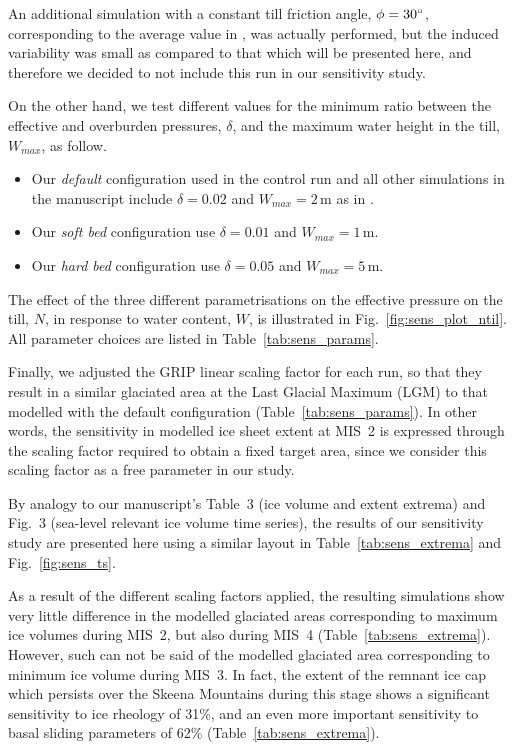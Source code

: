 An additional simulation with a constant till friction angle, $\phi=30^{\circ}$,
corresponding to the average value in \citet[p.~268]{Cuffey.Paterson.2010}, was
actually performed, but the induced variability was small as compared to that
which will be presented here, and therefore we decided to not include this run
in our sensitivity study.

On the other hand, we test different values for the minimum ratio between the
effective and overburden pressures, $\delta$, and the maximum water
height in the till, $W_{max}$, as follow.

\begin{itemize}
    \item{Our \emph{default} configuration used in the control run and all other
          simulations in the manuscript include $\delta=0.02$ and
          $W_{max}=2$\,m as in \citet{Bueler.Pelt.2015}.}
    \item{Our \emph{soft bed} configuration use $\delta=0.01$ and
          $W_{max}=1$\,m.}
    \item{Our \emph{hard bed} configuration use $\delta=0.05$ and
          $W_{max}=5$\,m.}
\end{itemize}

The effect of the three different parametrisations on the effective pressure on
the till, $N$, in response to water content, $W$, is illustrated in
Fig.~\ref{fig:sens_plot_ntil}.
All parameter choices are listed in Table~\ref{tab:sens_params}.

Finally, we adjusted the GRIP linear scaling factor for each run, so that they
result in a similar glaciated area at the Last Glacial Maximum (LGM) to that
modelled with the default configuration (Table~\ref{tab:sens_params}).
In other words, the sensitivity in modelled ice sheet extent at MIS~2 is
expressed through the scaling factor required to obtain a fixed target area,
since we consider this scaling factor as a free parameter in our study.


By analogy to our manuscript's Table~3 (ice volume and extent extrema) and
Fig.~3 (sea-level relevant ice volume time series), the results of our
sensitivity study are presented here using a similar layout in
Table~\ref{tab:sens_extrema} and Fig.~\ref{fig:sens_ts}.

As a result of the different scaling factors applied, the resulting simulations
show very little difference in the modelled glaciated areas corresponding to
maximum ice volumes during MIS~2, but also during MIS~4
(Table~\ref{tab:sens_extrema}). However, such can not be said of the modelled
glaciated area corresponding to minimum ice volume during MIS~3. In fact, the
extent of the remnant ice cap which persists over the Skeena Mountains during
this stage shows a significant sensitivity to ice rheology of 31\%, and
an even more important sensitivity to basal sliding parameters of 62\%
(Table~\ref{tab:sens_extrema}).

